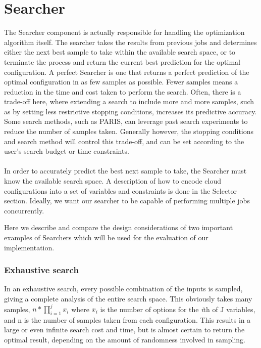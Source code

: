 \documentclass{report}
\begin{document}
\section{Searcher}
The Searcher component is actually responsible for handling the optimization algorithm itself. The searcher takes the results from previous jobs and determines either the next best sample to take within the available search space, or to terminate the process and return the current best prediction for the optimal configuration. A perfect Searcher is one that returns a perfect prediction of the optimal configuration in as few samples as possible. Fewer samples means a reduction in the time and cost taken to perform the search. Often, there is a trade-off here, where extending a search to include more and more samples, such as by setting less restrictive stopping conditions, increases its predictive accuracy. Some search methods, such as PARIS\cite{Yadwadkar2017}, can leverage past search experiments to reduce the number of samples taken. Generally however, the stopping conditions and search method will control this trade-off, and can be set according to the user's search budget or time constraints. 

\paragraph{}
In order to accurately predict the best next sample to take, the Searcher must know the available search space.  A description of how to encode cloud configurations into a set of variables and constraints is done in the Selector section. Ideally, we want our searcher to be capable of performing multiple jobs concurrently.
 
Here we describe and compare the design considerations of two important examples of Searchers which will be used for the evaluation of our implementation.

\subsubsection{Exhaustive search}
In an exhaustive search, every possible combination of the inputs is sampled, giving a complete analysis of the entire search space. This obviously takes many samples, $n * \prod_{i=1}^{j} x_{i}$ where $x_{i}$ is the number of options for the \textit{i}th of J variables, and n is the number of samples taken from each configuration. This results in a large or even infinite search cost and time, but is almost certain to return the optimal result, depending on the amount of randomness involved in sampling.
\end{document}
